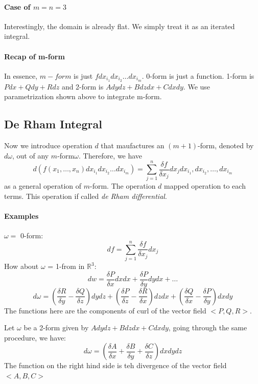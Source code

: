 \documentclass[11pt, oneside]{article}   	%
\begin{document}
\paragraph{Case of $m=n=3$}
Interestingly, the domain is already flat. We simply treat it as an iterated integral. 

\paragraph{Recap of m-form}
In essence, $m-form$ is just $fdx_{i_1}dx_{i_2}\ldots dx_{i_m}$. 0-form is just a function. 1-form is $Pdx + Qdy + Rdz$ and 2-form is $Adydz + Bdzdx + Cdxdy$. We use parametrization shown above to integrate m-form.

\subsection{De Rham Integral}
Now we introduce operation $d$ that maufactures an $(m+1)$-form, denoted by $d\omega$, out of any $m$-form$\omega$. Therefore, we have $$d(f(x_1, \ldots, x_n)dx_{i_1}dx_{i_2}\ldots dx_{i_m}) = \sum_{j=1}^n \frac{\delta f}{\delta x_j} dx_j dx_{i_1},dx_{i_2},\ldots ,dx_{i_m}$$ as a general operation of $m$-form. The operation $d$ mapped operation to each terms. This operation if called \emph{de Rham differential}. 
\paragraph{Examples}
$\omega =  $ 0-form: $$df = \sum_{j=1}^{n} \frac{\delta f}{\delta x_j} dx_j$$
How about $\omega$ = 1-from in $\mathbb{R}^3$: $$dw = \frac{\delta P}{\delta x} dxdx + \frac{\delta P}{\delta y} dydx + \ldots$$
$$d\omega = (\frac{\delta R}{\delta y} - \frac{\delta Q}{\delta z})dydz + (\frac{\delta P}{\delta z} - \frac{\delta R}{\delta x})dzdx + (\frac{\delta Q}{\delta x} - \frac{\delta P}{\delta y})dxdy $$
The functions here are the components of curl of the vector field $<P, Q, R>$. 
\par
Let $\omega$ be a 2-form given by $Adydz + Bdzdx + Cdxdy$, going through the same procedure, we have: $$d\omega = (\frac{\delta A}{\delta x} + \frac{\delta B}{\delta y} + \frac{\delta C}{\delta z})dxdydz$$
The function on the right hind side is teh divergence of the vector field $<A,B,C>$
\end{document}
